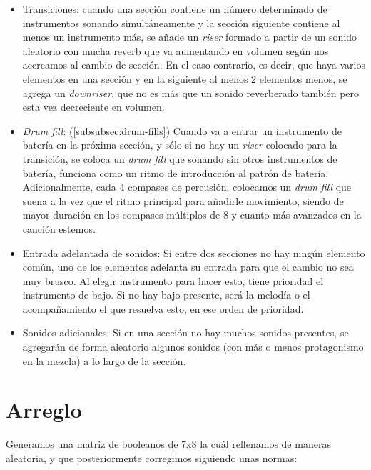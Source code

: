 \begin{itemize}

\item Transiciones: cuando una sección contiene un número determinado de instrumentos sonando simultáneamente y la sección siguiente contiene al menos un instrumento más, se añade un \textit{riser} formado a partir de un sonido aleatorio con mucha reverb que va aumentando en volumen según nos acercamos al cambio de sección. En el caso contrario, es decir, que haya varios elementos en una sección y en la siguiente al menos 2 elementos menos, se agrega un \textit{downriser}, que no es más que un sonido reverberado también pero esta vez decreciente en volumen.

\item \textit{Drum fill}: (\ref{subsubsec:drum-fills}) Cuando va a entrar un instrumento de batería en la próxima sección, y sólo si no hay un \textit{riser} colocado para la transición, se coloca un \textit{drum fill} que sonando sin otros instrumentos de batería, funciona como un ritmo de introducción al patrón de batería. Adicionalmente, cada 4 compases de percusión, colocamos un \textit{drum fill} que suena a la vez que el ritmo principal para añadirle movimiento, siendo de mayor duración en los compases múltiplos de 8 y cuanto más avanzados en la canción estemos.

\item  Entrada adelantada de sonidos: Si entre dos secciones no hay ningún elemento común, uno de los elementos adelanta su entrada para que el cambio no sea muy brusco. Al elegir instrumento para hacer esto, tiene prioridad el instrumento de bajo. Si no hay bajo presente, será la melodía o el acompañamiento el que resuelva esto, en ese orden de prioridad.

\item  Sonidos adicionales: Si en una sección no hay muchos sonidos presentes, se agregarán de forma aleatorio algunos sonidos (con más o menos protagonismo en la mezcla) a lo largo de la sección.


\end{itemize}

\section{Arreglo}
\label{sec:arreglo}

Generamos una matriz de booleanos de 7x8 la cuál rellenamos de maneras aleatoria, y que posteriormente corregimos siguiendo unas normas:

